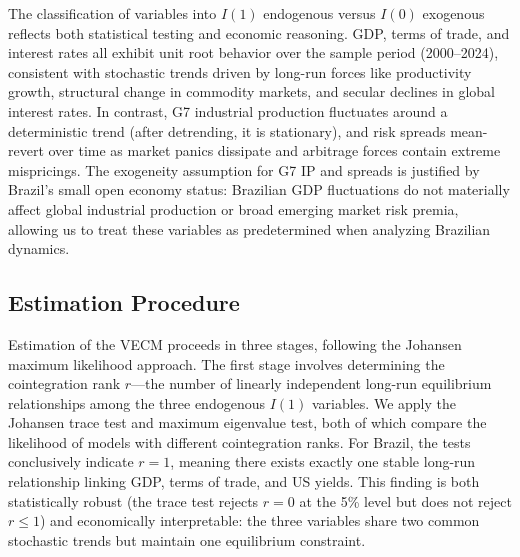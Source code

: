 \documentclass[12pt,a4paper]{article}
\numberwithin{equation}{section}
\theoremstyle{definition}
\theoremstyle{remark}
\begin{document}
The classification of variables into $I(1)$ endogenous versus $I(0)$ exogenous reflects both statistical testing and economic reasoning. GDP, terms of trade, and interest rates all exhibit unit root behavior over the sample period (2000--2024), consistent with stochastic trends driven by long-run forces like productivity growth, structural change in commodity markets, and secular declines in global interest rates. In contrast, G7 industrial production fluctuates around a deterministic trend (after detrending, it is stationary), and risk spreads mean-revert over time as market panics dissipate and arbitrage forces contain extreme mispricings. The exogeneity assumption for G7 IP and spreads is justified by Brazil's small open economy status: Brazilian GDP fluctuations do not materially affect global industrial production or broad emerging market risk premia, allowing us to treat these variables as predetermined when analyzing Brazilian dynamics.


\subsection{Estimation Procedure}

Estimation of the VECM proceeds in three stages, following the Johansen maximum likelihood approach. The first stage involves determining the cointegration rank $r$---the number of linearly independent long-run equilibrium relationships among the three endogenous $I(1)$ variables. We apply the Johansen trace test and maximum eigenvalue test, both of which compare the likelihood of models with different cointegration ranks. For Brazil, the tests conclusively indicate $r=1$, meaning there exists exactly one stable long-run relationship linking GDP, terms of trade, and US yields. This finding is both statistically robust (the trace test rejects $r=0$ at the 5\% level but does not reject $r \leq 1$) and economically interpretable: the three variables share two common stochastic trends but maintain one equilibrium constraint.
\end{document}
